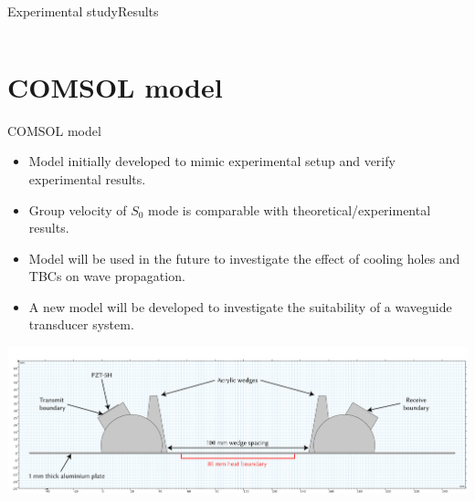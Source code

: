 \documentclass[aspectratio=169, 9pt]{beamer}
\begin{document}
\begin{frame}{Experimental study}{Results}
\begin{columns}
\begin{column}{0.5\textwidth}
\begin{center}
       \end{center}
    \end{column}
  \end{columns}
\end{frame}


\section{COMSOL model}
\begin{frame}{COMSOL model}

\begin{itemize}
    \item Model initially developed to mimic experimental setup and verify experimental results.
    \item Group velocity of $S_0$ mode is comparable with theoretical/experimental results.
    \item Model will be used in the future to investigate the effect of cooling holes and TBCs on wave propagation. 
    \item A new model will be developed to investigate the suitability of a waveguide transducer system.  
\end{itemize}

\begin{center}
  \includegraphics[width=\textwidth]{images/comsoldiagram.png}
 \end{center}

\end{frame}

\end{document}
